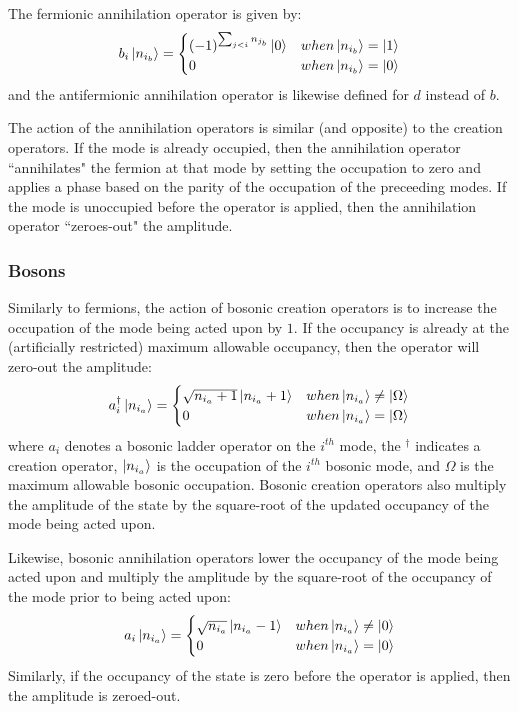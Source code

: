 The fermionic annihilation operator is given by:
\begin{equation}
    b_i \ket{n_{i_b}} = 
    \begin{cases} 
        (-1)^{\sum_{j < i} n_{j_b}} \ket{0}  & when \ket{n_{i_b}} = \ket{1} \\
        0 & when \ket{n_{i_b}} = \ket{0}
    \end{cases}
\end{equation}
and the antifermionic annihilation operator is likewise defined for $d$ instead of $b$.

The action of the annihilation operators is similar (and opposite) to the creation operators.
If the mode is already occupied, then the annihilation operator ``annihilates" the fermion at that mode by setting the occupation to zero and applies a phase based on the parity of the occupation of the preceeding modes.
If the mode is unoccupied before the operator is applied, then the annihilation operator ``zeroes-out" the amplitude.

\subsubsection{Bosons}

Similarly to fermions, the action of bosonic creation operators is to increase the occupation of the mode being acted upon by $1$.
If the occupancy is already at the (artificially restricted) maximum allowable occupancy, then the operator will zero-out the amplitude:
\begin{equation}
    \label{eq:bosonic-creation}
    a_i^\dagger \ket{n_{i_a}} = 
    \begin{cases} 
        \sqrt{n_{i_a} + 1} \ket{n_{i_a} + 1}  & when \ket{n_{i_a}} \neq \ket{\Omega} \\
        0 & when \ket{n_{i_a}} = \ket{\Omega}
    \end{cases}
\end{equation}
where $a_i$ denotes a bosonic ladder operator on the $i^{th}$ mode, the $^\dagger$ indicates a creation operator, $\ket{n_{i_a}}$ is the occupation of the $i^{th}$ bosonic mode, and $\Omega$ is the maximum allowable bosonic occupation.
Bosonic creation operators also multiply the amplitude of the state by the square-root of the updated occupancy of the mode being acted upon.

Likewise, bosonic annihilation operators lower the occupancy of the mode being acted upon and multiply the amplitude by the square-root of the occupancy of the mode prior to being acted upon:
\begin{equation}
    \label{eq:bosonic-annihilation}
    a_i \ket{n_{i_a}} = 
    \begin{cases} 
        \sqrt{n_{i_a}} \ket{n_{i_a} - 1}  & when \ket{n_{i_a}} \neq \ket{0} \\
        0 & when \ket{n_{i_a}} = \ket{0}
    \end{cases}
\end{equation}
Similarly, if the occupancy of the state is zero before the operator is applied, then the amplitude is zeroed-out.

